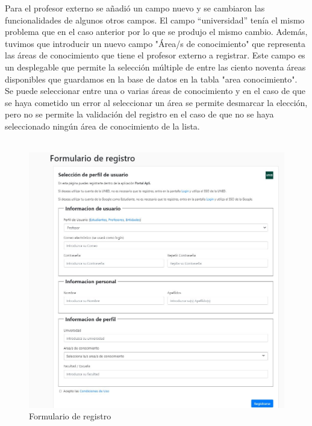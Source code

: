 \documentclass[11pt]{article}
\begin{document}
Para el profesor externo se añadió un campo nuevo y se cambiaron las funcionalidades de algunos otros campos. El campo “universidad” tenía el mismo problema que en el caso anterior por lo que se produjo el mismo cambio. Además, tuvimos que introducir un nuevo campo "Área/s de conocimiento" que representa las áreas de conocimiento que tiene el profesor externo a registrar. Este campo es un desplegable que permite la selección múltiple de entre las ciento noventa áreas disponibles que guardamos en la base de datos en la tabla "area conocimiento". Se puede seleccionar entre una o varias áreas de conocimiento y en el caso de que se haya cometido un error al seleccionar un área se permite desmarcar la elección, pero no se permite la validación del registro en el caso de que no se haya seleccionado ningún área de conocimiento de la lista.\\\\

\begin{figure}
	\centering
	\includegraphics[scale=0.7]{registro}
	\caption{Formulario de registro}
\end{figure}
\end{document}
